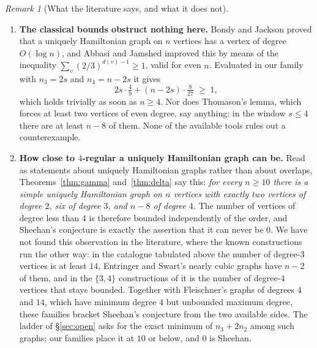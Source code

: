 \documentclass[11pt,a4paper]{article}
\theoremstyle{definition}
\theoremstyle{remark}
\newtheorem{remark}[theorem]{Remark}
\begin{document}
\begin{remark}[What the literature says, and what it does not]
\begin{enumerate}[label=(\arabic*)]
\item \textbf{The classical bounds obstruct nothing here.} Bondy and Jackson \cite{bj98} proved that a uniquely Hamiltonian graph on $n$ vertices has a vertex of degree $O(\log n)$, and Abbasi and Jamshed \cite{aj06} improved this by means of the inequality $\sum_v(2/3)^{d(v)-1}\ge1$, valid for even $n$. Evaluated in our family with $n_3=2s$ and $n_4=n-2s$ it gives
\[
2s\cdot\tfrac49+(n-2s)\cdot\tfrac8{27}\;\ge\;1,
\]
which holds trivially as soon as $n\ge4$. Nor does Thomason's lemma, which forces at least two vertices of even degree, say anything: in the window $s\le4$ there are at least $n-8$ of them. None of the available tools rules out a counterexample.

\item \textbf{How close to $4$-regular a uniquely Hamiltonian graph can be.} Read as statements about uniquely Hamiltonian graphs rather than about overlaps, Theorems~\ref{thm:gamma} and~\ref{thm:delta} say this: \emph{for every $n\ge10$ there is a simple uniquely Hamiltonian graph on $n$ vertices with exactly two vertices of degree $2$, six of degree $3$, and $n-8$ of degree $4$.} The number of vertices of degree less than $4$ is therefore bounded independently of the order, and Sheehan's conjecture is exactly the assertion that it can never be $0$. We have not found this observation in the literature, where the known constructions run the other way: in the catalogue tabulated above the number of degree-$3$ vertices is at least $14$, Entringer and Swart's nearly cubic graphs have $n-2$ of them, and in the $\{3,4\}$ constructions of \cite{bdp24,gjlsz} it is the number of degree-$4$ vertices that stays bounded. Together with Fleischner's graphs of degrees $4$ and $14$, which have minimum degree $4$ but unbounded maximum degree, these families bracket Sheehan's conjecture from the two available sides. The ladder of \S\ref{sec:open} asks for the exact minimum of $n_3+2n_2$ among such graphs; our families place it at $10$ or below, and $0$ is Sheehan.
\end{enumerate}
\end{remark}
\end{document}
